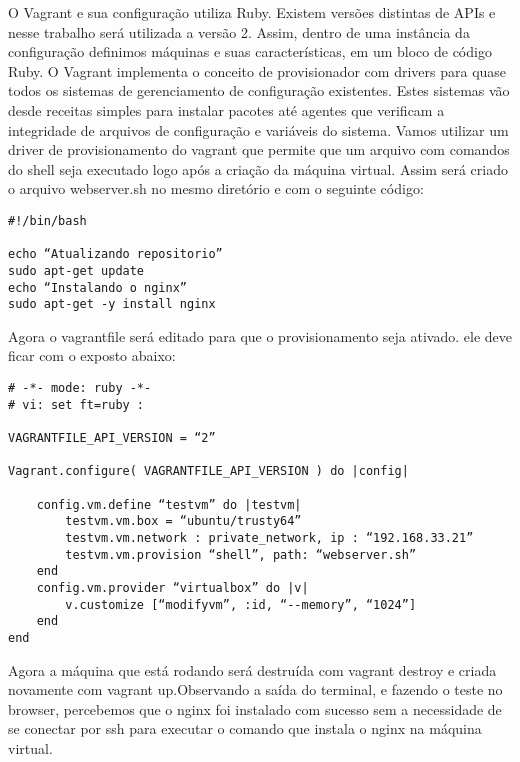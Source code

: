 O Vagrant e sua configuração utiliza Ruby. Existem 
versões distintas de APIs e nesse trabalho será utilizada 
a versão 2. Assim, dentro de uma instância da configuração 
definimos máquinas e suas características, em um bloco de 
código Ruby.
O Vagrant implementa o conceito de provisionador com 
drivers para quase todos os sistemas de gerenciamento de 
configuração existentes. Estes sistemas vão desde receitas 
simples para instalar pacotes até agentes que verificam a 
integridade de arquivos de configuração e variáveis do 
sistema. Vamos utilizar um driver de provisionamento do 
vagrant que permite que um arquivo com comandos do shell 
seja executado logo após a criação da máquina virtual. 
Assim será criado o arquivo webserver.sh no mesmo diretório 
e com o seguinte código: 
\begin{lstlisting}
#!/bin/bash

echo “Atualizando repositorio”
sudo apt-get update
echo “Instalando o nginx”
sudo apt-get -y install nginx
\end{lstlisting}
Agora o vagrantfile será editado para que o provisionamento 
seja ativado. ele deve ficar com o exposto abaixo:
\begin{lstlisting}
# -*- mode: ruby -*-
# vi: set ft=ruby :

VAGRANTFILE_API_VERSION = “2”

Vagrant.configure( VAGRANTFILE_API_VERSION ) do |config|

	config.vm.define “testvm” do |testvm|
		testvm.vm.box = “ubuntu/trusty64”
		testvm.vm.network : private_network, ip : “192.168.33.21”
		testvm.vm.provision “shell”, path: “webserver.sh”
	end
	config.vm.provider “virtualbox” do |v|
		v.customize [“modifyvm”, :id, “--memory”, “1024”]
	end
end
\end{lstlisting}
Agora a máquina que está rodando será 
destruída com vagrant destroy e criada novamente com 
vagrant up.Observando a saída do terminal, e fazendo 
o teste no browser, percebemos que o nginx foi 
instalado com sucesso sem a necessidade de se conectar 
por ssh para executar o comando que instala o nginx na 
máquina virtual.

